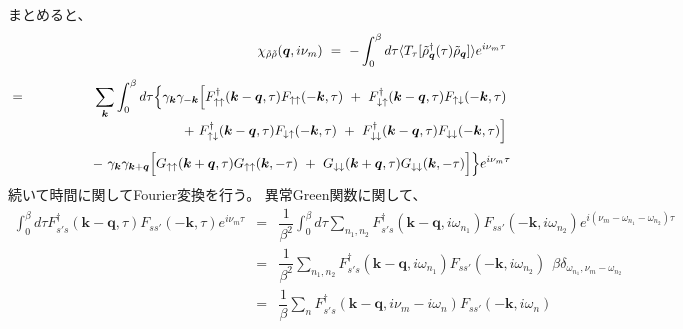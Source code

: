 \documentclass[a4j]{jsarticle}
\begin{document}
まとめると、
%
%
%
%
\begin{eqnarray}
	&&
	\chi_{\tilde{\rho} \tilde{\rho}}(\bm{q},i \nu_{m})
	\ = \
	-
	\int^{\beta}_{0} d \tau
	\langle T_{\tau}[ \tilde{\rho}_{\bm{q}}^{\dagger} (\tau) \tilde{\rho}_{\bm{q}} ] \rangle
	e^{i \nu_{m} \tau}
	\nonumber \ \\[2mm]
	&=&
	\sum_{ \bm{k} }
	\int^{\beta}_{0} d \tau
	\Big\{
	\gamma_{\bm{k}}
	\gamma_{-\bm{k}}
	\Big[
		F_{ \uparrow \uparrow }^{\dagger}( \bm{k} - \bm{q} , \tau )
		F_{ \uparrow \uparrow } ( - \bm{k} , \tau )
		\ + \
		F_{ \downarrow \uparrow }^{\dagger}( \bm{k} - \bm{q} , \tau )
		F_{ \uparrow \downarrow } ( - \bm{k} , \tau )
		\nonumber \ \\[-1mm] && \hspace{29mm} + \
	F_{ \uparrow \downarrow }^{\dagger}( \bm{k} - \bm{q} , \tau )
	F_{ \downarrow \uparrow } ( - \bm{k} , \tau )
	\ + \
	F_{ \downarrow \downarrow }^{\dagger}( \bm{k} - \bm{q} , \tau )
	F_{ \downarrow \downarrow } ( - \bm{k} , \tau )
	\Big]
	\nonumber \ \\[1mm] && \hspace{15mm} - \
	\gamma_{\bm{k}}
	\gamma_{\bm{k}+\bm{q}}
	\Big[
		G_{\uparrow \uparrow}( \bm{k}+\bm{q} , \tau)
		G_{\uparrow \uparrow}( \bm{k} , - \tau)
		\ + \
		G_{\downarrow \downarrow}( \bm{k}+\bm{q} , \tau)
		G_{\downarrow \downarrow}( \bm{k} , - \tau)
		\Big]
	\Big\}
	e^{i \nu_{m} \tau}
\end{eqnarray}
%
%
%
%
続いて時間に関してFourier変換を行う。
異常Green関数に関して、
%
%
%
%
\begin{eqnarray}
	\int^{\beta}_{0} d \tau
	F_{ s' s }^{\dagger}( \bm{k} - \bm{q} , \tau )
	F_{ s s' } ( - \bm{k} , \tau )
	e^{i \nu_{m} \tau}
	&=&
	\dfrac{1}{\beta^{2}}
	\int^{\beta}_{0} d \tau
	\sum_{n_{1},n_{2}}
	F_{ s' s }^{\dagger}( \bm{k} - \bm{q} , i \omega_{n_{1}} )
	F_{ s s' } ( - \bm{k} , i \omega_{n_{2}} )
	e^{i ( \nu_{m} - \omega_{n_{1}} - \omega_{n_{2}} ) \tau }
	\nonumber \\[2mm] &=&
	\dfrac{ 1 }{\beta^{2}} \sum_{n_{1},n_{2}}
	F_{ s' s }^{\dagger}( \bm{k} - \bm{q} , i \omega_{n_{1}} )
	F_{ s s' } ( - \bm{k} , i \omega_{n_{2}} )
	\ \ \beta
	\delta_{ \omega_{n_{1}} , \nu_{m} - \omega_{n_{2}} }
	\nonumber \\[2mm] &=&
	\dfrac{ 1 }{\beta} \sum_{n}
	F_{ s' s }^{\dagger}( \bm{k} - \bm{q} , i \nu_{m} - i \omega_{n} )
	F_{ s s' } ( - \bm{k} , i \omega_{n} )
\end{eqnarray}
\end{document}
